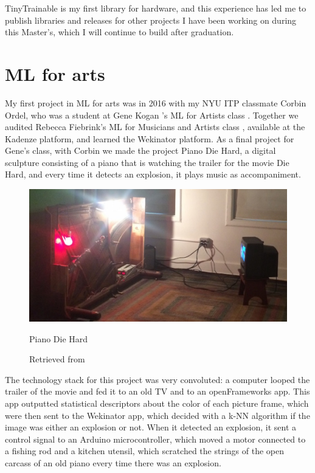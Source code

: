 TinyTrainable is my first library for hardware, and this experience has led me to publish libraries and releases for other projects I have been working on during this Master's, which I will continue to build after graduation.

\section{ML for arts}

My first project in \acrshort{ML} for arts was in 2016 with my \acrshort{NYU} \acrshort{ITP} classmate Corbin Ordel, who was a student at Gene Kogan \cite{website-gene-kogan}'s \acrshort{ML} for Artists class \cite{website-gene-kogan-machine-learning-for-artists}. Together we audited Rebecca Fiebrink\cite{website-rebecca-fiebrink}'s \acrshort{ML} for Musicians and Artists class \cite{kadenze-ml-for-musicians-and-artists}, available at the Kadenze platform, and learned the Wekinator \cite{website-wekinator} platform. As a final project for Gene's class, with Corbin we made the project Piano Die Hard, a digital sculpture consisting of a piano that is watching the trailer for the movie Die Hard, and every time it detects an explosion, it plays music as accompaniment.

\begin{figure}[ht]
  \centering
  \includegraphics[width=0.80\linewidth,height=0.40\textheight,keepaspectratio]{images/piano-die-hard.jpg}
  \caption{Piano Die Hard}
  \caption*{Retrieved from \cite{website-alt-ai}}
  \label{fig:piano-die-hard}
\end{figure}

The technology stack for this project was very convoluted: a computer looped the trailer of the movie and fed it to an old TV and to an openFrameworks app. This app outputted statistical descriptors about the color of each picture frame, which were then sent to the Wekinator app, which decided with a \acrshort{k-NN} algorithm if the image was either an explosion or not. When it detected an explosion, it sent a control signal to an Arduino microcontroller, which moved a motor connected to a fishing rod and a kitchen utensil, which scratched the strings of the open carcass of an old piano every time there was an explosion.

